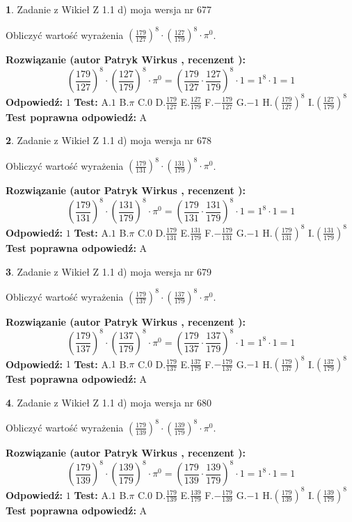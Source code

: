 \documentclass[12pt, a4paper]{article}
\theoremstyle{definition} %
\newtheorem{zad}{}
\newcommand{\zadStart}[1]{\begin{zad}#1\newline}
\newcommand{\zadStop}{\end{zad}}
\newcommand{\rozwStart}[2]{\noindent \textbf{Rozwiązanie (autor #1 , recenzent #2): }\newline}
\newcommand{\rozwStop}{\newline}
\newcommand{\odpStart}{\noindent \textbf{Odpowiedź:}\newline}
\newcommand{\odpStop}{\newline}
\newcommand{\testStart}{\noindent \textbf{Test:}\newline}
\newcommand{\testStop}{\newline}
\newcommand{\kluczStart}{\noindent \textbf{Test poprawna odpowiedź:}\newline}
\newcommand{\kluczStop}{\newline}
\begin{document}
\zadStart{Zadanie z Wikieł Z 1.1 d) moja wersja nr 677}

Obliczyć wartość wyrażenia $(\frac{179}{127})^{8} \cdot (\frac{127}{179})^{8} \cdot \pi^{0}$.
\zadStop
\rozwStart{Patryk Wirkus}{}
$$(\frac{179}{127})^{8} \cdot (\frac{127}{179})^{8} \cdot \pi^{0} = (\frac{179}{127} \cdot \frac{127}{179})^{8} \cdot 1 = 1^{8} \cdot 1 = 1$$
\rozwStop
\odpStart
$1$
\odpStop
\testStart
A.$1$ B.$\pi$ C.$0$ D.$\frac{179}{127}$ E.$\frac{127}{179}$
F.$-\frac{179}{127}$ G.$-1$
H.$(\frac{179}{127})^{8}$
I.$(\frac{127}{179})^{8}$
\testStop
\kluczStart
A
\kluczStop



\zadStart{Zadanie z Wikieł Z 1.1 d) moja wersja nr 678}

Obliczyć wartość wyrażenia $(\frac{179}{131})^{8} \cdot (\frac{131}{179})^{8} \cdot \pi^{0}$.
\zadStop
\rozwStart{Patryk Wirkus}{}
$$(\frac{179}{131})^{8} \cdot (\frac{131}{179})^{8} \cdot \pi^{0} = (\frac{179}{131} \cdot \frac{131}{179})^{8} \cdot 1 = 1^{8} \cdot 1 = 1$$
\rozwStop
\odpStart
$1$
\odpStop
\testStart
A.$1$ B.$\pi$ C.$0$ D.$\frac{179}{131}$ E.$\frac{131}{179}$
F.$-\frac{179}{131}$ G.$-1$
H.$(\frac{179}{131})^{8}$
I.$(\frac{131}{179})^{8}$
\testStop
\kluczStart
A
\kluczStop



\zadStart{Zadanie z Wikieł Z 1.1 d) moja wersja nr 679}

Obliczyć wartość wyrażenia $(\frac{179}{137})^{8} \cdot (\frac{137}{179})^{8} \cdot \pi^{0}$.
\zadStop
\rozwStart{Patryk Wirkus}{}
$$(\frac{179}{137})^{8} \cdot (\frac{137}{179})^{8} \cdot \pi^{0} = (\frac{179}{137} \cdot \frac{137}{179})^{8} \cdot 1 = 1^{8} \cdot 1 = 1$$
\rozwStop
\odpStart
$1$
\odpStop
\testStart
A.$1$ B.$\pi$ C.$0$ D.$\frac{179}{137}$ E.$\frac{137}{179}$
F.$-\frac{179}{137}$ G.$-1$
H.$(\frac{179}{137})^{8}$
I.$(\frac{137}{179})^{8}$
\testStop
\kluczStart
A
\kluczStop



\zadStart{Zadanie z Wikieł Z 1.1 d) moja wersja nr 680}

Obliczyć wartość wyrażenia $(\frac{179}{139})^{8} \cdot (\frac{139}{179})^{8} \cdot \pi^{0}$.
\zadStop
\rozwStart{Patryk Wirkus}{}
$$(\frac{179}{139})^{8} \cdot (\frac{139}{179})^{8} \cdot \pi^{0} = (\frac{179}{139} \cdot \frac{139}{179})^{8} \cdot 1 = 1^{8} \cdot 1 = 1$$
\rozwStop
\odpStart
$1$
\odpStop
\testStart
A.$1$ B.$\pi$ C.$0$ D.$\frac{179}{139}$ E.$\frac{139}{179}$
F.$-\frac{179}{139}$ G.$-1$
H.$(\frac{179}{139})^{8}$
I.$(\frac{139}{179})^{8}$
\testStop
\kluczStart
A
\kluczStop
\end{document}
